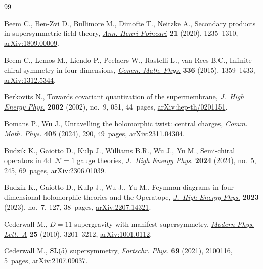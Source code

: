 \begin{thebibliography}{99}
\footnotesize\itemsep=0pt

Beem C., Ben-Zvi D., Bullimore M., Dimofte T., Neitzke A., Secondary products
 in supersymmetric field theory,
 \href{https://doi.org/10.1007/s00023-020-00888-3}{\textit{Ann. Henri
 Poincar\'e}} \textbf{21} (2020), 1235--1310,
 \href{http://arxiv.org/abs/1809.00009}{arXiv:1809.00009}.

Beem C., Lemos M., Liendo P., Peelaers W., Rastelli L., van Rees B.C., Infinite
 chiral symmetry in four dimensions,
 \href{https://doi.org/10.1007/s00220-014-2272-x}{\textit{Comm. Math. Phys.}}
 \textbf{336} (2015), 1359--1433,
 \href{http://arxiv.org/abs/1312.5344}{arXiv:1312.5344}.

Berkovits N., Towards covariant quantization of the supermembrane,
 \href{https://doi.org/10.1088/1126-6708/2002/09/051}{\textit{J.~High Energy
 Phys.}} \textbf{2002} (2002), no.~9, 051, 44~pages,
 \href{http://arxiv.org/abs/hep-th/0201151}{arXiv:hep-th/0201151}.

Bomans P., Wu J., Unravelling the holomorphic twist: central charges,
 \href{https://doi.org/10.1007/s00220-024-05167-4}{\textit{Comm. Math. Phys.}}
 \textbf{405} (2024), 290, 49~pages,
 \href{http://arxiv.org/abs/2311.04304}{arXiv:2311.04304}.

Budzik K., Gaiotto D., Kulp J., Williams B.R., Wu J., Yu M., Semi-chiral
 operators in 4d~{$\mathcal{N} = 1$} gauge theories,
 \href{https://doi.org/10.1007/jhep05(2024)245}{\textit{J.~High Energy Phys.}}
 \textbf{2024} (2024), no.~5, 245, 69~pages,
 \href{http://arxiv.org/abs/2306.01039}{arXiv:2306.01039}.

Budzik K., Gaiotto D., Kulp J., Wu J., Yu M., Feynman diagrams in
 four-dimensional holomorphic theories and the {O}peratope,
 \href{https://doi.org/10.1007/jhep07(2023)127}{\textit{J.~High Energy Phys.}}
 \textbf{2023} (2023), no.~7, 127, 38~pages,
 \href{http://arxiv.org/abs/2207.14321}{arXiv:2207.14321}.

Cederwall M., {$D=11$} supergravity with manifest supersymmetry,
 \href{https://doi.org/10.1142/S0217732310034407}{\textit{Modern Phys.
 Lett.~A}} \textbf{25} (2010), 3201--3212,
 \href{http://arxiv.org/abs/1001.0112}{arXiv:1001.0112}.

Cederwall M., {${\rm SL}(5)$} supersymmetry,
 \href{https://doi.org/10.1002/prop.202100116}{\textit{Fortschr. Phys.}}
 \textbf{69} (2021), 2100116, 5~pages,
 \href{http://arxiv.org/abs/2107.09037}{arXiv:2107.09037}.


\end{thebibliography}
